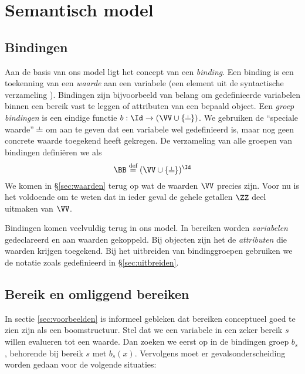 \chapter{Semantisch model}

\section{Bindingen}\label{sec:bindingen}

Aan de basis van ons model ligt het concept van een \emph{binding}. Een binding is een toekenning van een \emph{waarde} aan een variabele (een element uit de syntactische verzameling \Id). Bindingen zijn bijvoorbeeld van belang om gedefinieerde variabelen binnen een bereik vast te leggen of attributen van een bepaald object. Een \emph{groep bindingen} is een eindige functie $b : \Id \to (\VV \cup \{\nil\})$. We gebruiken de ``speciale waarde'' $\nil$ om aan te geven dat een variabele wel gedefinieerd is, maar nog geen concrete waarde toegekend heeft gekregen. De verzameling van alle groepen van bindingen definiëren we als
\begin{equation*}
  \BB \DEF (\VV \cup \{\nil\})^\Id
\end{equation*}
We komen in §\ref{sec:waarden} terug op wat de waarden $\VV$ precies zijn. Voor nu is het voldoende om te weten dat in ieder geval de gehele getallen $\ZZ$ deel uitmaken van $\VV$.

Bindingen komen veelvuldig terug in ons model. In bereiken worden \emph{variabelen} gedeclareerd en aan waarden gekoppeld. Bij objecten zijn het de \emph{attributen} die waarden krijgen toegekend. Bij het uitbreiden van bindinggroepen gebruiken we de notatie zoals gedefinieerd in §\ref{sec:uitbreiden}.


\section{Bereik en omliggend bereiken}
\label{sec:bereiken}

In sectie \ref{sec:voorbeelden} is informeel gebleken dat bereiken conceptueel goed te zien zijn als een boomstructuur. Stel dat we een variabele  in een zeker bereik $s$ willen evalueren tot een waarde. Dan zoeken we  eerst op in de bindingen groep $b_s$, behorende bij bereik $s$ met $b_s(x)$.
Vervolgens moet er gevalsonderscheiding worden gedaan voor de volgende situaties:

